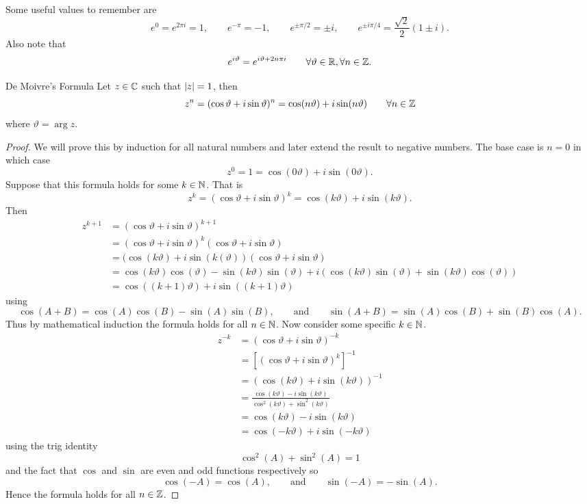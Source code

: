\documentclass{article}
\begin{document}
    Some useful values to remember are
    \[e^0 = e^{2\pi i} = 1, \qquad e^{-\pi} = -1, \qquad e^{\pm\pi/2} = \pm i, \qquad e^{\pm i\pi/4} = \frac{\sqrt{2}}{2}(1 \pm i).\]
    Also note that
    \[e^{i\vartheta} = e^{i\vartheta + 2n\pi i}\qquad \forall\vartheta\in\mathbb{R}, \forall n\in\mathbb{Z}.\]
    
    \begin{theorem}{De Moivre's Formula}{}
        Let \(z\in\mathbb{C}\) such that \(\abs{z} = 1\), then
        \[z^n = (\cos\vartheta + i\sin\vartheta)^n = \cos(n\vartheta) + i\sin(n\vartheta)\qquad \forall n\in\mathbb{Z}\]
        where \(\vartheta = \arg z\).
    \end{theorem}
    \begin{proof}
        We will prove this by induction for all natural numbers and later extend the result to negative numbers.
        The base case is \(n = 0\) in which case
        \[z^0 = 1 = \cos(0 \vartheta) + i\sin(0\vartheta).\]
        Suppose that this formula holds for some \(k\in\mathbb{N}\).
        That is
        \[z^k = (\cos\vartheta + i\sin\vartheta)^k = \cos(k\vartheta) + i\sin(k\vartheta).\]
        Then
        \begin{align*}
            z^{k + 1} &= (\cos\vartheta + i\sin\vartheta)^{k+1}\\
            &= (\cos\vartheta + i\sin\vartheta)^k(\cos\vartheta + i\sin\vartheta)\\
            &= (\cos(k\vartheta) + i\sin(k(\vartheta))(\cos\vartheta + i\sin\vartheta)\\
            &= \cos(k\vartheta)\cos(\vartheta) - \sin(k\vartheta)\sin(\vartheta) + i(\cos(k\vartheta)\sin(\vartheta) + \sin(k\vartheta)\cos(\vartheta))\\
            &= \cos((k + 1)\vartheta) + i\sin((k + 1)\vartheta)
        \end{align*}
        using
        \[\cos(A + B) = \cos(A)\cos(B) - \sin(A)\sin(B), \qquad\text{and}\qquad \sin(A + B) = \sin(A)\cos(B) + \sin(B)\cos(A).\]
        Thus by mathematical induction the formula holds for all \(n\in\mathbb{N}\).
        Now consider some specific \(k\in\mathbb{N}\).
        \begin{align*}
            z^{-k} &= (\cos\vartheta + i\sin\vartheta)^{-k}\\
            &= \left[(\cos\vartheta + i\sin\vartheta)^k\right]^{-1}\\
            &= (\cos(k\vartheta) + i\sin(k\vartheta))^{-1}\\
            &= \frac{\cos(k\vartheta) - i\sin(k\vartheta)}{\cos^2(k\vartheta) + \sin^2(k\vartheta)}\\
            &= \cos(k\vartheta) - i\sin(k\vartheta)\\
            &= \cos(-k\vartheta) + i\sin(-k\vartheta)
        \end{align*}
        using the trig identity
        \[\cos^2(A) + \sin^2(A) = 1\]
        and the fact that \(\cos\) and \(\sin\) are even and odd functions respectively so
        \[\cos(-A) = \cos(A), \qquad\text{and}\qquad \sin(-A) = -\sin(A).\]
        Hence the formula holds for all \(n\in\mathbb{Z}\).
    \end{proof}
\end{document}
